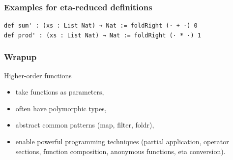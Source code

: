 \documentclass{beamer}
\begin{document}
\begin{frame}[fragile]
  \frametitle{Examples for eta-reduced definitions}
\begin{lstlisting}
def sum' : (xs : List Nat) → Nat := foldRight (· + ·) 0
def prod' : (xs : List Nat) → Nat := foldRight (· * ·) 1
\end{lstlisting}
\end{frame}



\begin{frame}
  \frametitle{Wrapup}
  \begin{alertblock}{Higher-order functions}
  \begin{itemize}
  \item take functions as parameters,
  \item often have polymorphic types,
  \item abstract common patterns (map, filter, foldr),
  \item enable powerful programming techniques (partial application, operator sections, function composition, anonymous functions, eta conversion).
  \end{itemize}
  \end{alertblock}
\end{frame}

\end{document}
